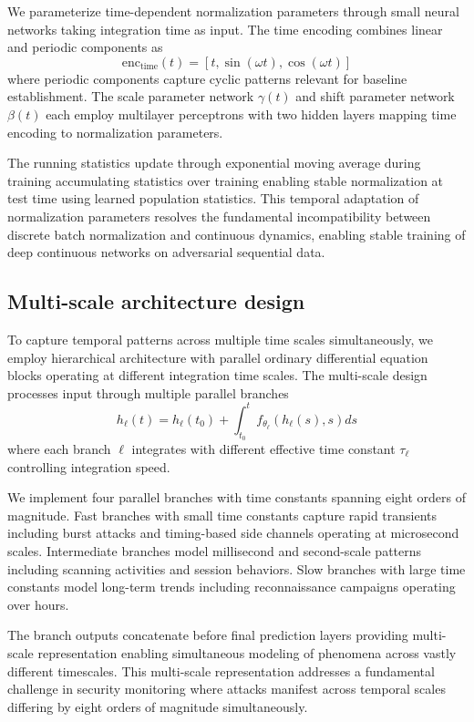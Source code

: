 \documentclass[10pt,journal,compsoc]{IEEEtran}
\begin{document}
We parameterize time-dependent normalization parameters through small neural networks taking integration time as input. The time encoding combines linear and periodic components as
\begin{equation}
\text{enc}_{\text{time}}(t) = [t, \sin(\omega t), \cos(\omega t)]
\end{equation}
where periodic components capture cyclic patterns relevant for baseline establishment. The scale parameter network $\gamma(t)$ and shift parameter network $\beta(t)$ each employ multilayer perceptrons with two hidden layers mapping time encoding to normalization parameters.

The running statistics update through exponential moving average during training accumulating statistics over training enabling stable normalization at test time using learned population statistics. This temporal adaptation of normalization parameters resolves the fundamental incompatibility between discrete batch normalization and continuous dynamics, enabling stable training of deep continuous networks on adversarial sequential data.

\subsection{Multi-scale architecture design}

To capture temporal patterns across multiple time scales simultaneously, we employ hierarchical architecture with parallel ordinary differential equation blocks operating at different integration time scales. The multi-scale design processes input through multiple parallel branches
\begin{equation}
h_\ell(t) = h_\ell(t_0) + \int_{t_0}^{t} f_{\theta_\ell}(h_\ell(s), s) ds
\end{equation}
where each branch $\ell$ integrates with different effective time constant $\tau_\ell$ controlling integration speed.

We implement four parallel branches with time constants spanning eight orders of magnitude. Fast branches with small time constants capture rapid transients including burst attacks and timing-based side channels operating at microsecond scales. Intermediate branches model millisecond and second-scale patterns including scanning activities and session behaviors. Slow branches with large time constants model long-term trends including reconnaissance campaigns operating over hours.

The branch outputs concatenate before final prediction layers providing multi-scale representation enabling simultaneous modeling of phenomena across vastly different timescales. This multi-scale representation addresses a fundamental challenge in security monitoring where attacks manifest across temporal scales differing by eight orders of magnitude simultaneously.
\end{document}
